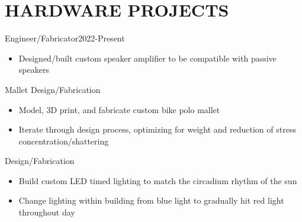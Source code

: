 
\section*{HARDWARE PROJECTS}


\subtitle{Speaker Amplifier}{Engineer/Fabricator}{2022-Present}

\begin{itemize}
    \item Designed/built custom speaker amplifier to be compatible with passive speakers
\end{itemize}



\subtitle{Bike Polo}{Mallet Design/Fabrication}{}
\begin{itemize}
    \item Model, 3D print, and fabricate custom bike polo mallet
    \item Iterate through design process, optimizing for weight and reduction of stress concentration/shattering
\end{itemize}   


\subtitle{LED Hula Hoop}{Design/Fabrication}{}
\begin{itemize}
    \item Build custom LED timed lighting to match the circadium rhythm of the sun
    \item Change lighting within building from blue light to gradually hit red light throughout day
\end{itemize}   
